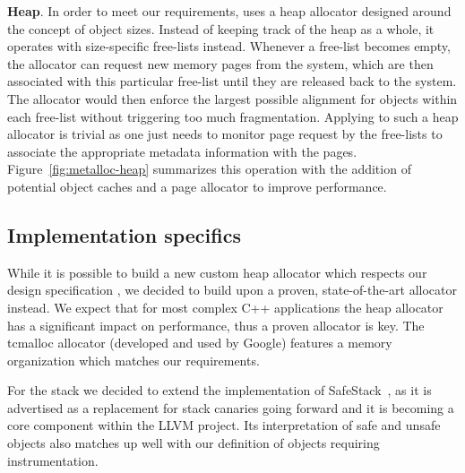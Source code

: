 \textbf{Heap}.
In order to meet our requirements,\projectname{} uses a heap allocator designed around the concept of object sizes.
Instead of keeping track of the heap as a whole, it operates with size-specific free-lists instead.
Whenever a free-list becomes empty, the allocator can request new memory pages from the system, which are
then associated with this particular free-list until they are released back to the system. The allocator would then
enforce the largest possible alignment for objects within each free-list without triggering too much
fragmentation. Applying \projectname{} to such a heap allocator is trivial as one just needs to monitor
page request by the free-lists to associate the appropriate metadata information with the pages. Figure~\ref{fig:metalloc-heap}
summarizes this operation with the addition of potential object caches and a page allocator to improve performance.

\subsection{Implementation specifics}
\label{sec:assumptions}

While it is possible to build a new custom heap allocator which respects our design specification
, we decided to build upon a proven, state-of-the-art allocator instead. We expect that for most
complex C++ applications the heap allocator has a significant impact
on performance, thus a proven allocator is key. The tcmalloc allocator 
(developed and used by Google) features a memory organization which matches our requirements.

For the stack we decided to extend the implementation of SafeStack~\cite{kuznetsov2014cpi}, as it is advertised
as a replacement for stack canaries going forward and it is becoming a core component within the LLVM
project. Its interpretation of safe and unsafe objects also matches up well with our definition of objects
requiring instrumentation. 

